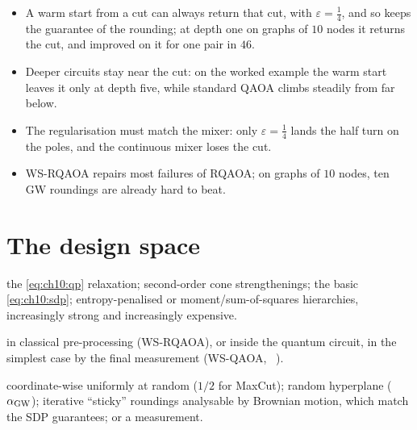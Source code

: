 \documentclass[handoutsbeamer.tex]{subfiles}
\begin{document}
\begin{frame}
\onp{\footnotesize}
\begin{itemize}\setlength\itemsep{0.3em}
    \item A warm start from a cut can always return that cut, with $\varepsilon = \frac14$, and so keeps the guarantee of the rounding; at depth one on graphs of $10$ nodes it returns the cut, and improved on it for one pair in $46$.
    \item Deeper circuits stay near the cut: on the worked example the warm start leaves it only at depth five, while standard QAOA climbs steadily from far below.
    \item The regularisation must match the mixer: only $\varepsilon = \frac14$ lands the half turn on the poles, and the continuous mixer loses the cut.
    \item WS-RQAOA repairs most failures of RQAOA; on graphs of $10$ nodes, ten GW roundings are already hard to beat.
\end{itemize}
\end{frame}

\section{The design space}

\begin{frame}
\begin{description}\setlength\itemsep{0.2em}
    \item[What to round?] the \eqref{eq:ch10:qp} relaxation; second-order cone strengthenings; the basic \eqref{eq:ch10:sdp}; entropy-penalised or moment/sum-of-squares hierarchies, increasingly strong and increasingly expensive.
    \item[When to round?] in classical pre-processing (WS-RQAOA), or inside the quantum circuit, in the simplest case by the final measurement (WS-QAOA, \Chap~).
    \item[How to round?] coordinate-wise uniformly at random ($1/2$ for MaxCut); random hyperplane ($\alpha_{\rm GW}$); iterative ``sticky'' roundings analysable by Brownian motion, which match the SDP guarantees; or a measurement.
\end{description}
\end{frame}
\end{document}
